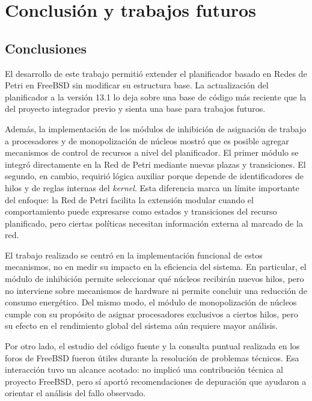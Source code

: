 \chapter{Conclusión y trabajos futuros}

\section{Conclusiones}

El desarrollo de este trabajo permitió extender el planificador basado en Redes de Petri en FreeBSD sin modificar su estructura base. La actualización del planificador a la versión 13.1 lo deja sobre una base de código más reciente que la del proyecto integrador previo y sienta una base para trabajos futuros.\par

Además, la implementación de los módulos de inhibición de asignación de trabajo a procesadores y de monopolización de núcleos mostró que es posible agregar mecanismos de control de recursos a nivel del planificador. El primer módulo se integró directamente en la Red de Petri mediante nuevas plazas y transiciones. El segundo, en cambio, requirió lógica auxiliar porque depende de identificadores de hilos y de reglas internas del \textit{kernel}. Esta diferencia marca un límite importante del enfoque: la Red de Petri facilita la extensión modular cuando el comportamiento puede expresarse como estados y transiciones del recurso planificado, pero ciertas políticas necesitan información externa al marcado de la red.\par

El trabajo realizado se centró en la implementación funcional de estos mecanismos, no en medir su impacto en la eficiencia del sistema. En particular, el módulo de inhibición permite seleccionar qué núcleos recibirán nuevos hilos, pero no interviene sobre mecanismos de hardware ni permite concluir una reducción de consumo energético. Del mismo modo, el módulo de monopolización de núcleos cumple con su propósito de asignar procesadores exclusivos a ciertos hilos, pero su efecto en el rendimiento global del sistema aún requiere mayor análisis.\par

Por otro lado, el estudio del código fuente y la consulta puntual realizada en los foros de FreeBSD fueron útiles durante la resolución de problemas técnicos. Esa interacción tuvo un alcance acotado: no implicó una contribución técnica al proyecto FreeBSD, pero sí aportó recomendaciones de depuración que ayudaron a orientar el análisis del fallo observado.\par

